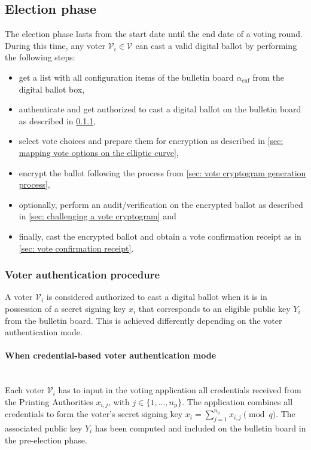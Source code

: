 \subsection{Election phase} \label{sec: election phase}
The election phase lasts from the start date until the end date of a voting round. During this time, any voter $\mathcal{V}_i \in \boldsymbol{\mathcal{V}}$ can cast a valid digital ballot by performing the following steps:
\begin{itemize}
    \item get a list with all configuration items of the bulletin board $\alpha_\mathrm{cnf}$ from the digital ballot box,
    \item authenticate and get authorized to cast a digital ballot on the bulletin board as described in \cref{sec: voter authentication procedure},
    \item select vote choices and prepare them for encryption as described in \cref{sec: mapping vote options on the elliptic curve},
    \item encrypt the ballot following the process from \cref{sec: vote cryptogram generation process},
    \item optionally, perform an audit/verification on the encrypted ballot as described in \cref{sec: challenging a vote cryptogram} and
    \item finally, cast the encrypted ballot and obtain a vote confirmation receipt as in \cref{sec: vote confirmation receipt}.
\end{itemize}


\subsubsection{Voter authentication procedure} \label{sec: voter authentication procedure}
A voter $\mathcal{V}_i$ is considered authorized to cast a digital ballot when it is in possession of a secret signing key $x_i$ that corresponds to an eligible public key $Y_i$ from the bulletin board. This is achieved differently depending on the voter authentication mode.


\paragraph{When credential-based voter authentication mode}\mbox{}\\
Each voter $\mathcal{V}_i$ has to input in the voting application all credentials received from the Printing Authorities $x_{i, j}$, with $j \in \{ 1, ..., n_\mathrm{p} \}$. The application combines all credentials to form the voter's secret signing key $x_i = \sum_{j=1}^{n_\mathrm{p}} x_{i, j} \pmod q$. The associated public key $Y_i$ has been computed and included on the bulletin board in the pre-election phase.



